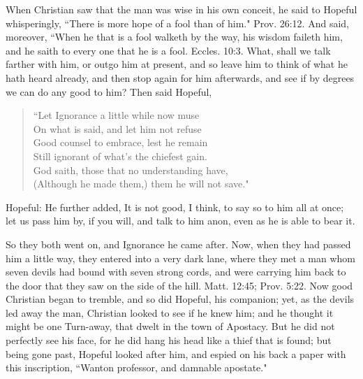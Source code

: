 When Christian saw that the man was wise in his own conceit, he said to Hopeful whisperingly, ``There is more hope of a fool than of him." Prov. 26:12. And said, moreover, ``When he that is a fool walketh by the way, his wisdom faileth him, and he saith to every one that he is a fool. Eccles. 10:3. What, shall we talk farther with him, or outgo him at present, and so leave him to think of what he hath heard already, and then stop again for him afterwards, and see if by degrees we can do any good to him? Then said Hopeful,
\begin{verse}
``Let Ignorance a little while now muse\\
On what is said, and let him not refuse\\
Good counsel to embrace, lest he remain\\
Still ignorant of what's the chiefest gain.\\
God saith, those that no understanding have,\\
(Although he made them,) them he will not save."\\
\end{verse}
Hopeful: He further added, It is not good, I think, to say so to him all at once; let us pass him by, if you will, and talk to him anon, even as he is able to bear it.

So they both went on, and Ignorance he came after. Now, when they had passed him a little way, they entered into a very dark lane, where they met a man whom seven devils had bound with seven strong cords, and were carrying him back to the door that they saw on the side of the hill. Matt. 12:45; Prov. 5:22. Now good Christian began to tremble, and so did Hopeful, his companion; yet, as the devils led away the man, Christian looked to see if he knew him; and he thought it might be one Turn-away, that dwelt in the town of Apostacy. But he did not perfectly see his face, for he did hang his head like a thief that is found; but being gone past, Hopeful looked after him, and espied on his back a paper with this inscription, ``Wanton professor, and damnable apostate."

